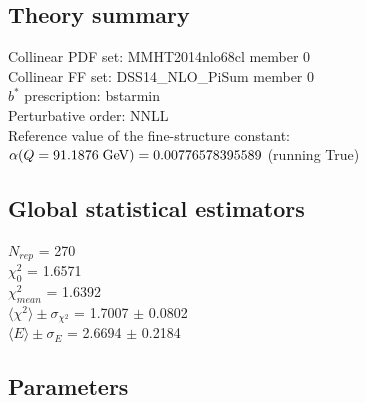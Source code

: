 \documentclass[
]{article}
\begin{document}
\hypertarget{theory-summary}{%
\subsection{Theory summary}\label{theory-summary}}

Collinear PDF set: MMHT2014nlo68cl member 0\\
Collinear FF set: DSS14\_NLO\_PiSum member 0\\
\(b^*\) prescription: bstarmin\\
Perturbative order: NNLL\\
Reference value of the fine-structure constant:
\(\alpha(Q = 91.1876\;{\rm GeV}) = 0.00776578395589\) (running True)

\hypertarget{global-statistical-estimators}{%
\subsection{Global statistical
estimators}\label{global-statistical-estimators}}

\(N_{rep}\) = 270\\
\(\chi_{0}^2\) = 1.6571\\
\(\chi_{mean}^2\) = 1.6392\\
\(\langle\chi^2\rangle \pm \sigma_{\chi^2}\) = 1.7007 \(\pm\) 0.0802\\
\(\langle E \rangle \pm \sigma_{E}\) = 2.6694 \(\pm\) 0.2184

\hypertarget{parameters}{%
\subsection{Parameters}\label{parameters}}
\end{document}
